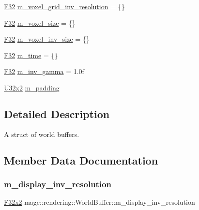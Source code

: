 \begin{DoxyCompactItemize}
\mbox{\hyperlink{namespacemage_aa97e833b45f06d60a0a9c4fc22ae02c0}{F32}} \mbox{\hyperlink{structmage_1_1rendering_1_1_world_buffer_a5f4fc26acde41470c46991b9981de12c}{m\+\_\+voxel\+\_\+grid\+\_\+inv\+\_\+resolution}} = \{\}
\item 
\mbox{\hyperlink{namespacemage_aa97e833b45f06d60a0a9c4fc22ae02c0}{F32}} \mbox{\hyperlink{structmage_1_1rendering_1_1_world_buffer_af18be87bdb94066df7bd5e52409b1c16}{m\+\_\+voxel\+\_\+size}} = \{\}
\item 
\mbox{\hyperlink{namespacemage_aa97e833b45f06d60a0a9c4fc22ae02c0}{F32}} \mbox{\hyperlink{structmage_1_1rendering_1_1_world_buffer_a86982007f533ae368a5c3b09dcbf4db6}{m\+\_\+voxel\+\_\+inv\+\_\+size}} = \{\}
\item 
\mbox{\hyperlink{namespacemage_aa97e833b45f06d60a0a9c4fc22ae02c0}{F32}} \mbox{\hyperlink{structmage_1_1rendering_1_1_world_buffer_a56f828aba079ff56ef931c1f9c903a38}{m\+\_\+time}} = \{\}
\item 
\mbox{\hyperlink{namespacemage_aa97e833b45f06d60a0a9c4fc22ae02c0}{F32}} \mbox{\hyperlink{structmage_1_1rendering_1_1_world_buffer_a8362f6c590aca2d17359abd0129a94bd}{m\+\_\+inv\+\_\+gamma}} = 1.\+0f
\item 
\mbox{\hyperlink{namespacemage_ae5e7ccf8a1785baaacf57b3a0f4324e2}{U32x2}} \mbox{\hyperlink{structmage_1_1rendering_1_1_world_buffer_a972a6cd26e8c6402733fe863001c79ed}{m\+\_\+padding}}
\end{DoxyCompactItemize}


\subsection{Detailed Description}
A struct of world buffers. 

\subsection{Member Data Documentation}
\mbox{\label{structmage_1_1rendering_1_1_world_buffer_a14b9521f67adaa823bdb9c45d833be1a}} 
\subsubsection{\texorpdfstring{m\+\_\+display\+\_\+inv\+\_\+resolution}{m\_display\_inv\_resolution}}
{\footnotesize\ttfamily \mbox{\hyperlink{namespacemage_aee4759dedc8def6c6dec26b5c7eddf29}{F32x2}} mage\+::rendering\+::\+World\+Buffer\+::m\+\_\+display\+\_\+inv\+\_\+resolution}

